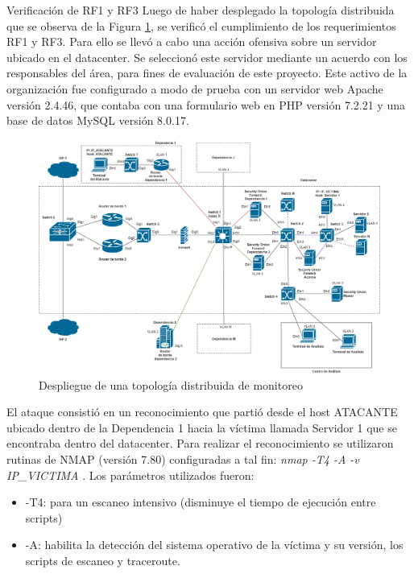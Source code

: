     \begin{section}{Verificación de RF1 y RF3}
        Luego de haber desplegado la topología distribuida que se observa de la Figura \ref{fig:iter1_ver_RF1_RF2}, se verificó el cumplimiento de los requerimientos RF1 y RF3. Para ello se llevó a cabo una acción ofensiva sobre un servidor ubicado en el datacenter. Se seleccionó este servidor mediante un acuerdo con los responsables del área, para fines de evaluación de este proyecto. Este activo de la organización fue configurado a modo de prueba con un servidor web Apache versión 2.4.46, que contaba con una formulario web en PHP versión  7.2.21  y una base de datos MySQL versión 8.0.17.\par
        \begin{figure}[H]
        \centering
            \includegraphics[width=1\textwidth]{./iteracion_1_imagenes/Topologia de despliegue descentralizada RF1 y RF3.png}
            \caption{Despliegue de una topología distribuida de monitoreo}
            \label{fig:iter1_ver_RF1_RF2}
            \end{figure}
            El ataque consistió en un reconocimiento que partió desde el host ATACANTE ubicado dentro de la Dependencia 1 hacia la víctima llamada Servidor 1 que se encontraba dentro del datacenter.
            Para realizar el reconocimiento se utilizaron rutinas de NMAP \cite{nmap} (versión 7.80) configuradas a tal fin: \textit{nmap -T4 -A -v IP\_VICTIMA} . Los parámetros utilizados fueron:
         \begin{itemize}
        \item -T4: para un escaneo intensivo (disminuye el tiempo de ejecución entre scripts)
        \item -A: habilita la detección del sistema operativo de la víctima y su versión, los scripts de escaneo y traceroute.

\end{itemize}
\end{section}
